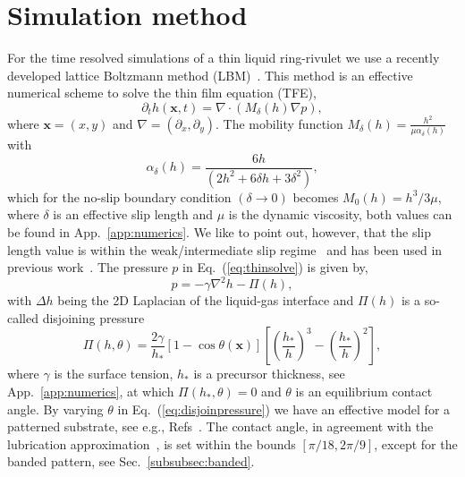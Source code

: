 \documentclass[twoside,twocolumn,9pt]{article}
\begin{document}
\section{Simulation method}
\label{sec:method}
For the time resolved simulations of a thin liquid ring-rivulet we use a recently developed lattice Boltzmann method (LBM)~\cite{zitzLatticeBoltzmannMethod2019, zitzLatticeBoltzmannSimulations2021, zitzSwalbeJlLattice2022, zitzControllingDewettingMorphologies2023}. 
This method is an effective numerical scheme to solve the thin film equation (TFE),  
\begin{equation}\label{eq:thinsolve}
     \partial_t h(\mathbf{x},t) = \nabla\cdot\left(M_{\delta}(h)\nabla p\right),
\end{equation}
where $\mathbf{x} = (x,y)$ and $\nabla = (\partial_x, \partial_y)$.
The mobility function $M_{\delta}(h) = \frac{h^2}{\mu\alpha_{\delta}(h)}$ with 
\begin{equation}\label{eq:alphafric}
    \alpha_{\delta}(h) = \frac{6h}{(2 h^2 + 6 \delta h + 3 \delta^2)},
\end{equation}
which for the no-slip boundary condition $(\delta \rightarrow 0)$ becomes $M_{0}(h) = h^3/3\mu$, where $\delta$ is an effective slip length and $\mu$ is the dynamic viscosity, both values can be found in App.~\ref{app:numerics}.
We like to point out, however, that the slip length value is within the weak/intermediate slip regime~\cite{peschkaSignaturesSlipDewetting2019,fetzerQuantifyingHydrodynamicSlip2007, munchLubricationModelsSmall2005} and has been used in previous work~\cite{zitzControllingDewettingMorphologies2023}.
The pressure $p$ in Eq.~(\ref{eq:thinsolve}) is given by,
\begin{equation}\label{eq:filmpressure}
    p = - \gamma\nabla^2 h -\Pi(h),
\end{equation}
with $\Delta h$ being the 2D Laplacian of the liquid-gas interface and $\Pi(h)$ is a so-called disjoining pressure~\cite{schwartzSimulationDropletMotion1998, crasterDynamicsStabilityThin2009, nguyenCompetitionCollapseBreakup2012, gonzalezStabilityLiquidRing2013}
\begin{equation}\label{eq:disjoinpressure}
    \Pi(h,\theta) = \frac{2\gamma}{h_{\ast}}[1-\cos\theta(\mathbf{x})]\left[\left(\frac{h_*}{h}\right)^3 -\left(\frac{h_*}{h}\right)^2\right],
\end{equation}
where $\gamma$ is the surface tension, $h_{\ast}$ is a precursor thickness, see App.~\ref{app:numerics}, at which $\Pi(h_{\ast}, \theta) = 0$ and $\theta$ is an equilibrium contact angle.
By varying $\theta$ in Eq.~(\ref{eq:disjoinpressure}) we have an effective model for a patterned substrate, see e.g., Refs~\cite{zitzLatticeBoltzmannSimulations2021, zitzControllingDewettingMorphologies2023}. 
The contact angle, in agreement with the lubrication approximation~\cite{oronLongscaleEvolutionThin1997, crasterDynamicsStabilityThin2009}, is set within the bounds $[\pi/18, 2\pi/9]$, except for the banded pattern, see Sec.~\ref{subsubsec:banded}. 
\end{document}
